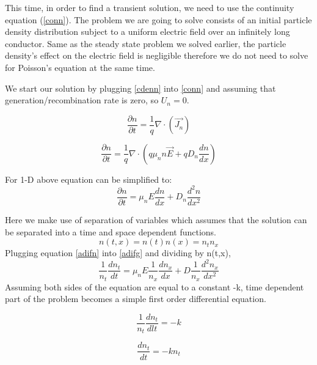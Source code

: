 This time, in order to find a transient solution, we need to use the continuity equation (\ref{conn}). The problem we are going to solve consists of an initial particle density distribution subject to a uniform electric field over an infinitely long conductor. Same as the steady state problem we solved earlier, the particle density's effect on the electric field is negligible therefore we do not need to solve for Poisson's equation at the same time. 

We start our solution by plugging \eqref{cdenn} into \eqref{conn} and assuming that generation/recombination rate is zero, so $U_{n}=0$.

\begin{equation}
\frac{\partial n}{\partial t} = \frac{1}{q}\nabla \cdot (\vec{J_n})
\end{equation}


\begin{equation}
\frac{\partial n}{\partial t} = \frac{1}{q}\nabla \cdot (q \mu_{n} n \vec{E}+qD_{n} \frac{dn}{dx} )
\end{equation}

For 1-D above equation can be simplified to:
\begin{equation}
\frac{\partial n}{\partial t} = \mu_n E \frac{d n}{d x}+D_{n}\frac{d^{2}n}{dx^{2}}
\label{adifg}
\end{equation}

Here we make use of separation of variables which assumes that the solution can be separated into a time and space dependent functions.
\begin{equation}
n(t,x)=n(t)n(x)=n_t n_x
\label{adifn}
\end{equation}
Plugging equation \eqref{adifn} into \eqref{adifg} and dividing by n(t,x),
\begin{equation}
\frac{1}{n_{t}}\frac{d n_{t}}{d t}=\mu_n E \frac{1}{n_{x}}\frac{d n_{x}}{dx}+D\frac{1}{n_{x}}\frac{d^2 n_{x}}{dx^2}
\label{Adif}
\end{equation}
Assuming both sides of the equation are equal to a constant -k, time dependent part of the problem becomes a simple first order differential equation.

\begin{equation}
\nonumber
\frac{1}{n_{t}}\frac{d n_{t}}{dl t}=-k
\end{equation}

\begin{equation}
\nonumber
\frac{d n_{t}}{d t}=-kn_t
\end{equation}

